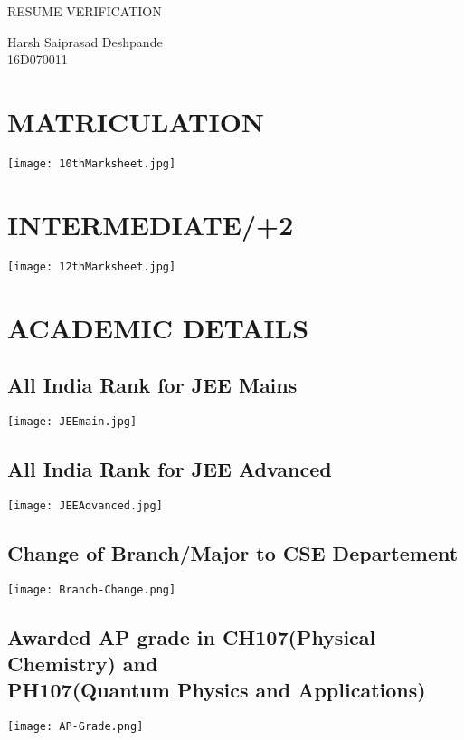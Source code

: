 \documentclass{article}
\begin{document}
	\begin{titlepage}
		\vspace*{\fill}
		\begin{center}
			\LARGE RESUME VERIFICATION\\
		\end{center}
		\begin{center}
			\Large Harsh Saiprasad Deshpande \\
			\Large 16D070011
			
		\end{center}
		\vspace*{\fill}
	\end{titlepage}
	\tableofcontents
	\newpage
	\section{MATRICULATION}
		\texttt{[image: 10thMarksheet.jpg]}{\centering}
	\section{INTERMEDIATE/+2}
		\texttt{[image: 12thMarksheet.jpg]}{\centering}
	\section{ACADEMIC DETAILS}
		\subsection{All India Rank for JEE Mains }
	\texttt{[image: JEEmain.jpg]}{\centering}
	\subsection{All India Rank for JEE Advanced }
		\texttt{[image: JEEAdvanced.jpg]}{\centering}
	\subsection{Change of Branch/Major to CSE Departement}
	\begin{center}
		\texttt{[image: Branch-Change.png]}{\centering}
	\end{center}
    \subsection{Awarded AP grade in CH107(Physical Chemistry) and \\ PH107(Quantum  Physics and Applications)}
	\begin{center}
		\texttt{[image: AP-Grade.png]}{\centering}
	\end{center}
\end{document}
